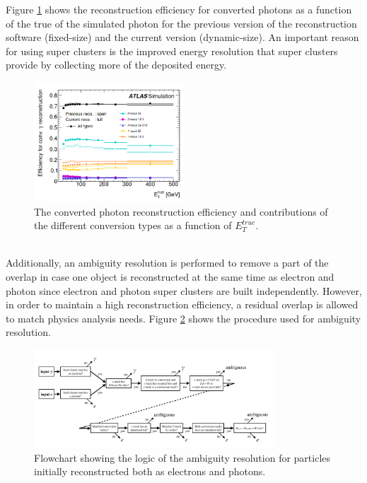 Figure \ref{fig:chap2:Objects:Egamma:Gamma:Conv:Reco:Eff} shows the reconstruction efficiency for converted photons as a function of the true \eT of the simulated photon for the previous version of the reconstruction software (fixed-size) and the current version (dynamic-size). An important reason for using super clusters is the improved energy resolution that super clusters provide by collecting more of the deposited energy.
\begin{figure}[htbp]
    \centering
    \includegraphics[width=0.5\textwidth]{Ch2/Img/Photon_conv_Reco_Eff.png}
    \caption{The converted photon reconstruction efficiency and contributions of the different conversion types as a function of $E^{true}_T$.}
    \label{fig:chap2:Objects:Egamma:Gamma:Conv:Reco:Eff}
\end{figure}
\\
Additionally, an ambiguity resolution is performed to remove a part of the overlap in case one object is reconstructed at the same time as electron and photon since electron and photon super clusters are built independently. However, in order to maintain a high reconstruction efficiency, a residual overlap is allowed to match physics analysis needs. Figure \ref{fig:chap2:Objects:Egamma:Ambg} shows the procedure used for ambiguity resolution. 
\begin{figure}[htbp]
    \centering
    \includegraphics[width=0.8\textwidth]{Ch2/Img/Ambiguity.png}
    \caption{Flowchart showing the logic of the ambiguity resolution for particles initially reconstructed both as electrons and photons.}
    \label{fig:chap2:Objects:Egamma:Ambg}
\end{figure}
